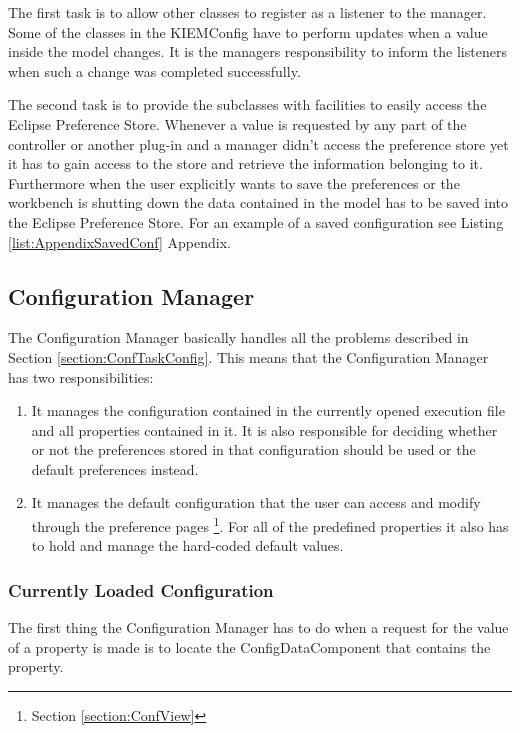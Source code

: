 The first task is to allow other classes to register as a listener to the manager. Some of the classes
in the \ac{KIEMConfig} have to perform updates when a value inside the model changes. It is the managers
responsibility to inform the listeners when such a change was completed successfully.

The second task is to provide the subclasses with facilities to easily access the Eclipse Preference Store.
Whenever a value is requested by any part of the controller or another plug-in and a manager didn't access
the preference store yet it has to gain access to the store and retrieve the information belonging to it.
Furthermore when the user explicitly wants to save the preferences or the workbench is shutting down the
data contained in the model has to be saved into the Eclipse Preference Store. For an example of a 
saved configuration see Listing \ref{list:AppendixSavedConf} Appendix.


\subsection{Configuration Manager}
\label{section:ConfigurationManager}
The Configuration Manager basically handles all the problems described in Section \ref{section:ConfTaskConfig}.
This means that the Configuration Manager has two responsibilities:
\begin{enumerate}
 \item It manages the configuration contained in the currently opened execution file and all properties contained in
it. It is also responsible for deciding whether or not the preferences stored in that configuration should be used
or the default preferences instead.
 \item It manages the default configuration that the user can access and modify through the 
preference pages \footnote{Section \ref{section:ConfView}}. For all of the predefined properties it also has to hold and manage the 
hard-coded default values.
\end{enumerate}

\subsubsection{Currently Loaded Configuration}
\label{section:CurrentConfiguration}
The first thing the Configuration Manager has to do when a request for the value of a property is made
is to locate the ConfigDataComponent that contains the property. 

